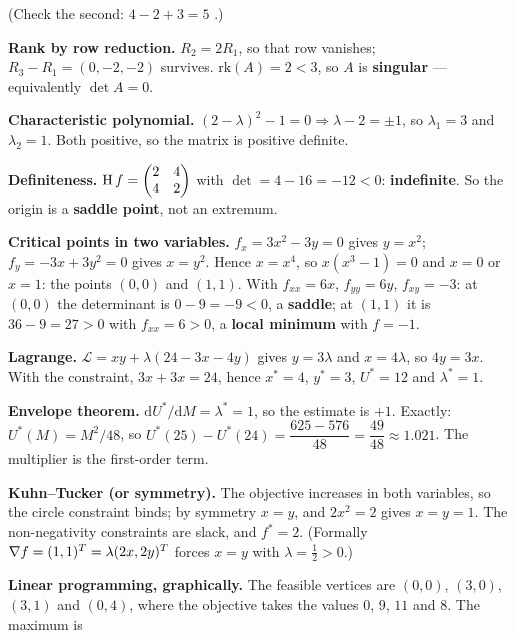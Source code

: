 \begin{solutions}
        (Check the second: $4-2+3=5$ \checkmark.)
  \item \textbf{Rank by row reduction.} $R_{2}=2R_{1}$, so that row
        vanishes; $R_{3}-R_{1}=(0,-2,-2)$ survives.
        $\mathrm{rk}(A)=2<3$, so $A$ is \textbf{singular} --- equivalently
        $\det A=0$.
  \item \textbf{Characteristic polynomial.}
        $(2-\lambda)^{2}-1=0\Rightarrow\lambda-2=\pm1$, so
        $\lambda_{1}=3$ and $\lambda_{2}=1$. Both positive, so the matrix
        is positive definite.
  \item \textbf{Definiteness.}
        $\operatorname{H} f=\begin{pmatrix}2&4\\4&2\end{pmatrix}$ with
        $\det=4-16=-12<0$: \textbf{indefinite}. So the origin is a
        \textbf{saddle point}, not an extremum.
  \item \textbf{Critical points in two variables.}
        $f_{x}=3x^{2}-3y=0$ gives $y=x^{2}$; $f_{y}=-3x+3y^{2}=0$ gives
        $x=y^{2}$. Hence $x=x^{4}$, so $x(x^{3}-1)=0$ and $x=0$ or $x=1$:
        the points $(0,0)$ and $(1,1)$. With $f_{xx}=6x$, $f_{yy}=6y$,
        $f_{xy}=-3$: at $(0,0)$ the determinant is $0-9=-9<0$, a
        \textbf{saddle}; at $(1,1)$ it is $36-9=27>0$ with $f_{xx}=6>0$, a
        \textbf{local minimum} with $f=-1$.
  \item \textbf{Lagrange.} $\mathcal{L}=xy+\lambda(24-3x-4y)$ gives
        $y=3\lambda$ and $x=4\lambda$, so $4y=3x$. With the constraint,
        $3x+3x=24$, hence $x^{*}=4$, $y^{*}=3$, $U^{*}=12$ and
        $\lambda^{*}=1$.
  \item \textbf{Envelope theorem.} $\mathrm{d}U^{*}/\mathrm{d}M
        =\lambda^{*}=1$, so the estimate is $+1$. Exactly:
        $U^{*}(M)=M^{2}/48$, so
        $U^{*}(25)-U^{*}(24)=\dfrac{625-576}{48}=\dfrac{49}{48}
        \approx1.021$. The multiplier is the first-order term.
  \item \textbf{Kuhn--Tucker (or symmetry).} The objective increases in
        both variables, so the circle constraint binds; by symmetry
        $x=y$, and $2x^{2}=2$ gives $x=y=1$. The non-negativity
        constraints are slack, and $f^{*}=2$. (Formally
        $\nabla f=(1,1)^{T}=\lambda(2x,2y)^{T}$ forces $x=y$ with
        $\lambda=\tfrac12>0$.)
  \item \textbf{Linear programming, graphically.} The feasible vertices
        are $(0,0)$, $(3,0)$, $(3,1)$ and $(0,4)$, where the objective
        takes the values $0$, $9$, $11$ and $8$. The maximum is

\end{solutions}
